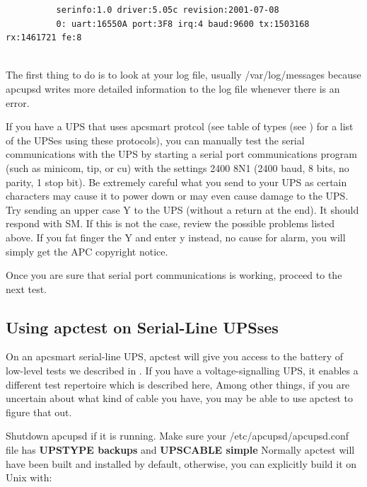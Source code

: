 {{{{{{{\begin{itemize}
\footnotesize
\begin{verbatim}
          serinfo:1.0 driver:5.05c revision:2001-07-08
          0: uart:16550A port:3F8 irq:4 baud:9600 tx:1503168 rx:1461721 fe:8
     
\end{verbatim}
\normalsize

\end{itemize}

The first thing to do is to look at your log file, usually /var/log/messages
because apcupsd writes more detailed information to the log file whenever
there is an error.  

If you have a UPS that uses apcsmart protcol (see table of types (see 
) for a list of the UPSes using
these protocols), you can manually test the serial communications with the UPS
by starting a serial port communications program (such as minicom, tip, or cu)
with the settings 2400 8N1 (2400 baud, 8 bits, no parity, 1 stop bit). Be
extremely careful what you send to your UPS as certain characters may cause it
to power down or may even cause damage to the UPS. Try sending an upper case Y
to the UPS (without a return at the end). It should respond with SM. If this
is not the case, review the possible problems listed above. If you fat finger
the Y and enter y instead, no cause for alarm, you will simply get the APC
copyright notice.  

Once you are sure that serial port communications is working, proceed to the
next test. 

\label{Using-apctest-on-Serial_002dLine-UPSses}

\subsection*{Using apctest on Serial-Line UPSses}

\label{index-apctest-222}
\label{index-Testing_002c-with-apctest-223}
On an apcsmart serial-line UPS, apctest will give you access to the battery of
low-level tests we described in 
.  If you have a voltage-signalling UPS, it
enables a different test repertoire which is described here, Among other
things, if you are uncertain about what kind of cable you have, you may be
able to use apctest to figure that out.  

Shutdown apcupsd if it is running. Make sure your /etc/apcupsd/apcupsd.conf
file has {\bf UPSTYPE backups} and {\bf UPSCABLE simple} Normally apctest will
have been built and installed by default, otherwise, you can explicitly build
it on Unix with: 

}}}}}}}
